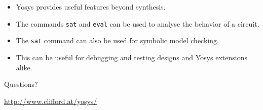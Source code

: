 \begin{frame}{\subsecname}
\begin{itemize}
\item Yosys provides useful features beyond synthesis.
\item The commands {\tt sat} and {\tt eval} can be used to analyse the behavior of a circuit.
\item The {\tt sat} command can also be used for symbolic model checking.
\item This can be useful for debugging and testing designs and Yosys extensions alike.
\end{itemize}

\bigskip
\bigskip
\begin{center}
Questions?
\end{center}

\bigskip
\bigskip
\begin{center}
\url{http://www.clifford.at/yosys/}
\end{center}
\end{frame}

